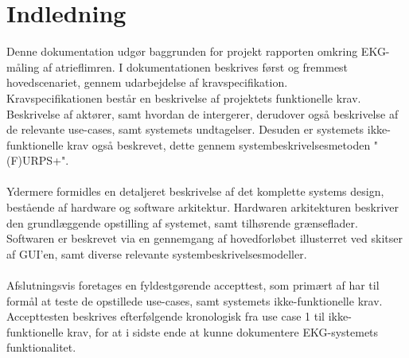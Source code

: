 \chapter{Indledning}
Denne dokumentation udgør baggrunden for projekt rapporten omkring EKG-måling af atrieflimren. I dokumentationen beskrives først og fremmest hovedscenariet, gennem udarbejdelse af kravspecifikation. \\
Kravspecifikationen består en beskrivelse af projektets funktionelle krav. Beskrivelse af aktører, samt hvordan de intergerer, derudover også beskrivelse af de relevante use-cases, samt systemets undtagelser. Desuden er systemets ikke-funktionelle krav også beskrevet, dette gennem systembeskrivelsesmetoden "(F)URPS+".\\ \\
Ydermere formidles en detaljeret beskrivelse af det komplette systems design, bestående af hardware og software arkitektur. Hardwaren arkitekturen beskriver den grundlæggende opstilling af systemet, samt tilhørende grænseflader. Softwaren er beskrevet via en gennemgang af hovedforløbet illusterret ved skitser af GUI'en, samt diverse relevante systembeskrivelsesmodeller. \\ \\
Afslutningsvis foretages en fyldestgørende accepttest, som primært af har til formål at teste de opstillede use-cases, samt systemets ikke-funktionelle krav. Accepttesten beskrives efterfølgende kronologisk fra use case 1 til ikke-funktionelle krav, for at i sidste ende at kunne dokumentere EKG-systemets funktionalitet.